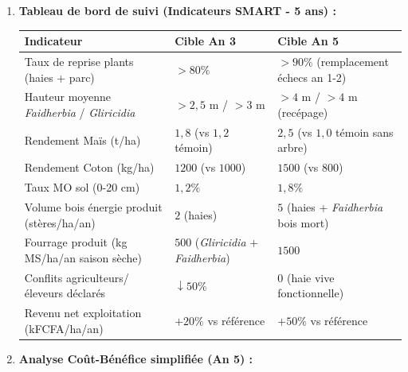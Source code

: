 \documentclass[11pt]{article}
\begin{document}
\begin{exoresolu}
\begin{enumerate}
        \begin{itemize}
            \item Négociation avec Chef de terre / Conseil villageois : \textbf{Convention locale écrite} (acte notarié ou délibération conseil) garantissant les droits de l'exploitant sur les arbres plantés (droit de plantation, récolte, transmission héréditaire) pour 25-30 ans minimum.
            \item Demande \textbf{Certificat Foncier} (Loi 74/1, 74/2, 2005/019) si possible, ou attestation de non-objection du chef de terre pour investissement long terme.
        \end{itemize}
        \item \textbf{Tableau de bord de suivi (Indicateurs SMART - 5 ans) :}
        \begin{center}
            \begin{tabular}{|l|l|l|}\hline
            \rowcolor{popblueL}
            \textbf{Indicateur} & \textbf{Cible An 3} & \textbf{Cible An 5} \\ \hline
            Taux de reprise plants (haies + parc) & $> 80\%$ & $> 90\%$ (remplacement échecs an 1-2) \\ \hline
            Hauteur moyenne \emph{Faidherbia} / \emph{Gliricidia} & $> 2,5$ m / $> 3$ m & $> 4$ m / $> 4$ m (recépage) \\ \hline
            Rendement Maïs (t/ha) & $1,8$ (vs $1,2$ témoin) & $2,5$ (vs $1,0$ témoin sans arbre) \\ \hline
            Rendement Coton (kg/ha) & $1200$ (vs $1000$) & $1500$ (vs $800$) \\ \hline
            Taux MO sol (0-20 cm) & $1,2\%$ & $1,8\%$ \\ \hline
            Volume bois énergie produit (stères/ha/an) & $2$ (haies) & $5$ (haies + \emph{Faidherbia} bois mort) \\ \hline
            Fourrage produit (kg MS/ha/an saison sèche) & $500$ (\emph{Gliricidia} + \emph{Faidherbia}) & $1500$ \\ \hline
            Conflits agriculteurs/éleveurs déclarés & $\downarrow 50\%$ & $0$ (haie vive fonctionnelle) \\ \hline
            Revenu net exploitation (kFCFA/ha/an) & $+ 20\%$ vs référence & $+ 50\%$ vs référence \\ \hline
        \end{tabular}
    \end{center}
        \item \textbf{Analyse Coût-Bénéfice simplifiée (An 5) :}

\end{enumerate}
\end{exoresolu}
\end{document}
